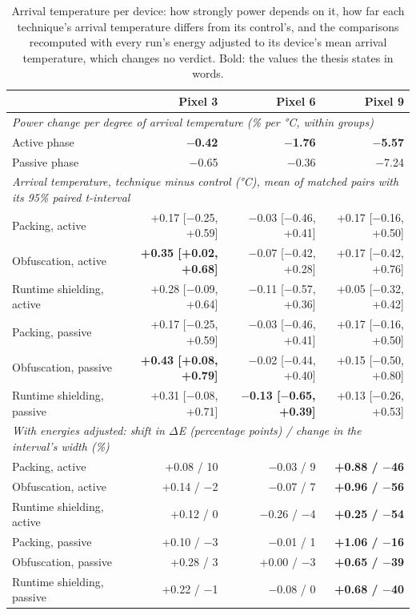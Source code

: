 \begin{table}[t]
\centering
\small
\caption{Arrival temperature per device: how strongly power depends on it, how far each technique's arrival temperature differs from its control's, and the comparisons recomputed with every run's energy adjusted to its device's mean arrival temperature, which changes no verdict. Bold: the values the thesis states in words.}
\label{tab:arrival-temperature}
\begin{tabular}{lrrr}
\toprule
\textbf{} & \textbf{Pixel 3} & \textbf{Pixel 6} & \textbf{Pixel 9} \\
\midrule
\multicolumn{4}{l}{\textit{Power change per degree of arrival temperature (\% per °C, within groups)}} \\
Active phase & \textbf{$-$0.42} & \textbf{$-$1.76} & \textbf{$-$5.57} \\
Passive phase & $-$0.65 & $-$0.36 & $-$7.24 \\
\midrule
\multicolumn{4}{l}{\textit{Arrival temperature, technique minus control (°C), mean of matched pairs with its 95\% paired t-interval}} \\
Packing, active & +0.17 [$-$0.25, +0.59] & $-$0.03 [$-$0.46, +0.41] & +0.17 [$-$0.16, +0.50] \\
Obfuscation, active & \textbf{+0.35 [+0.02, +0.68]} & $-$0.07 [$-$0.42, +0.28] & +0.17 [$-$0.42, +0.76] \\
Runtime shielding, active & +0.28 [$-$0.09, +0.64] & $-$0.11 [$-$0.57, +0.36] & +0.05 [$-$0.32, +0.42] \\
Packing, passive & +0.17 [$-$0.25, +0.59] & $-$0.03 [$-$0.46, +0.41] & +0.17 [$-$0.16, +0.50] \\
Obfuscation, passive & \textbf{+0.43 [+0.08, +0.79]} & $-$0.02 [$-$0.44, +0.40] & +0.15 [$-$0.50, +0.80] \\
Runtime shielding, passive & +0.31 [$-$0.08, +0.71] & \textbf{$-$0.13 [$-$0.65, +0.39]} & +0.13 [$-$0.26, +0.53] \\
\midrule
\multicolumn{4}{l}{\textit{With energies adjusted: shift in $\Delta$E (percentage points) / change in the interval's width (\%)}} \\
Packing, active & +0.08 / 10 & $-$0.03 / 9 & \textbf{+0.88 / $-$46} \\
Obfuscation, active & +0.14 / $-$2 & $-$0.07 / 7 & \textbf{+0.96 / $-$56} \\
Runtime shielding, active & +0.12 / 0 & $-$0.26 / $-$4 & \textbf{+0.25 / $-$54} \\
Packing, passive & +0.10 / $-$3 & $-$0.01 / 1 & \textbf{+1.06 / $-$16} \\
Obfuscation, passive & +0.28 / 3 & +0.00 / $-$3 & \textbf{+0.65 / $-$39} \\
Runtime shielding, passive & +0.22 / $-$1 & $-$0.08 / 0 & \textbf{+0.68 / $-$40} \\
\bottomrule
\end{tabular}
\end{table}
